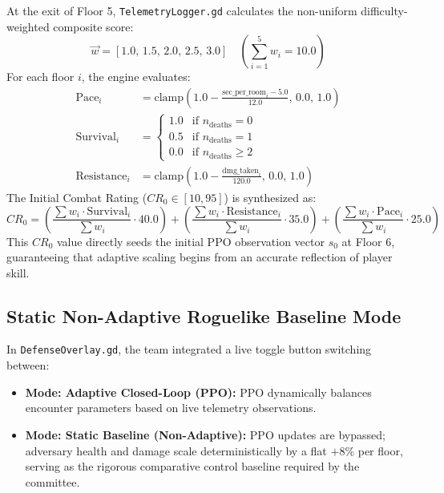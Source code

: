 At the exit of Floor 5, \texttt{TelemetryLogger.gd} calculates the non-uniform difficulty-weighted composite score:
\begin{equation}
\vec{w} = [1.0, \, 1.5, \, 2.0, \, 2.5, \, 3.0] \quad \left(\sum_{i=1}^5 w_i = 10.0\right)
\label{eq:weights}
\end{equation}
For each floor $i$, the engine evaluates:
\begin{align}
\text{Pace}_i &= \text{clamp}\left(1.0 - \frac{\text{sec\_per\_room}_i - 5.0}{12.0}, \, 0.0, \, 1.0\right) \\
\text{Survival}_i &= \begin{cases} 1.0 & \text{if } n_{\text{deaths}} = 0 \\ 0.5 & \text{if } n_{\text{deaths}} = 1 \\ 0.0 & \text{if } n_{\text{deaths}} \ge 2 \end{cases} \\
\text{Resistance}_i &= \text{clamp}\left(1.0 - \frac{\text{dmg\_taken}_i}{120.0}, \, 0.0, \, 1.0\right)
\end{align}
The Initial Combat Rating ($CR_0 \in [10, 95]$) is synthesized as:
\begin{equation}
CR_0 = \left(\frac{\sum w_i \cdot \text{Survival}_i}{\sum w_i} \cdot 40.0\right) + \left(\frac{\sum w_i \cdot \text{Resistance}_i}{\sum w_i} \cdot 35.0\right) + \left(\frac{\sum w_i \cdot \text{Pace}_i}{\sum w_i} \cdot 25.0\right)
\label{eq:cr0_formula}
\end{equation}
This $CR_0$ value directly seeds the initial PPO observation vector $s_0$ at Floor 6, guaranteeing that adaptive scaling begins from an accurate reflection of player skill.

\subsection{Static Non-Adaptive Roguelike Baseline Mode}
In \texttt{DefenseOverlay.gd}, the team integrated a live toggle button switching between:
\begin{itemize}
    \item \textbf{Mode: Adaptive Closed-Loop (PPO):} PPO dynamically balances encounter parameters based on live telemetry observations.
    \item \textbf{Mode: Static Baseline (Non-Adaptive):} PPO updates are bypassed; adversary health and damage scale deterministically by a flat $+8\%$ per floor, serving as the rigorous comparative control baseline required by the committee.
\end{itemize}

